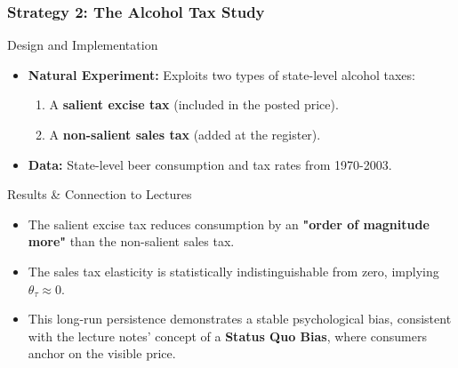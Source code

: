 \documentclass{beamer}
\begin{document}
\begin{frame}
\frametitle{Strategy 2: The Alcohol Tax Study}

\begin{block}{Design and Implementation}
\begin{itemize}
    \item \textbf{Natural Experiment:} Exploits two types of state-level alcohol taxes:
        \begin{enumerate}
            \item A \textbf{salient excise tax} (included in the posted price).
            \item A \textbf{non-salient sales tax} (added at the register).
        \end{enumerate}
    \item \textbf{Data:} State-level beer consumption and tax rates from 1970-2003.
\end{itemize}
\end{block}

\begin{exampleblock}{Results & Connection to Lectures}
\begin{itemize}
    \item The salient excise tax reduces consumption by an \textbf{"order of magnitude more"} than the non-salient sales tax.
    \item The sales tax elasticity is statistically indistinguishable from zero, implying $\theta_{\tau} \approx 0$.
    \item This long-run persistence demonstrates a stable psychological bias, consistent with the lecture notes' concept of a \textbf{Status Quo Bias}, where consumers anchor on the visible price.
\end{itemize}
\end{exampleblock}
\end{frame}

\end{document}
